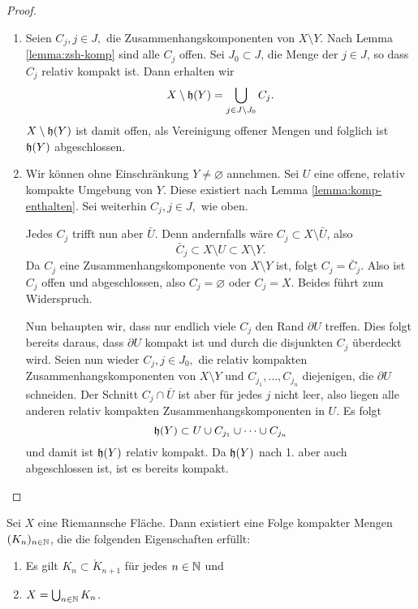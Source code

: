 \begin{proof}
  \begin{enumerate}
  \item Seien $C_j, j \in J,$ die Zusammenhangskomponenten von $X
    \setminus Y$. Nach Lemma \ref{lemma:zsh-komp} sind alle $C_j$ offen.
    Sei $J_0 \subset J$, die Menge der $j \in J$, so dass $C_j$
    relativ kompakt ist. Dann erhalten wir
    \[
    X \setminus \mathfrak{h}(Y) = \bigcup_{j \in J\setminus J_0} C_j.
    \]
    $X \setminus \mathfrak{h}(Y)$ ist damit offen, als Vereinigung offener Mengen und folglich
    ist $\mathfrak{h}(Y)$ abgeschlossen.
  \item Wir können ohne Einschränkung $Y \neq \varnothing$
    annehmen. Sei $U$ eine offene, relativ kompakte Umgebung von
    $Y$. Diese existiert nach Lemma \ref{lemma:komp-enthalten}.
    Sei weiterhin $C_j, j \in J,$ wie oben.

    Jedes $C_j$ trifft nun aber $\bar U$. Denn andernfalls wäre $C_j
    \subset X \setminus \bar U$, also
    \[
    \bar C_j \subset X \setminus U \subset X \setminus Y.
    \]
    Da $C_j$ eine
    Zusammenhangskomponente von $X \setminus Y$ ist, folgt $C_j =
    \bar C_j$. Also ist $C_j$ offen und abgeschlossen, also $C_j =
    \varnothing$ oder $C_j = X$. Beides führt zum Widerspruch.

    Nun behaupten wir, dass nur endlich viele $C_j$ den Rand $\partial
    U$ treffen. 
    Dies folgt bereits daraus, dass $\partial U$ kompakt ist und durch die
    disjunkten $C_j$ überdeckt wird.
    Seien nun wieder $C_j, j \in J_0,$ die relativ kompakten
    Zusammenhangskomponenten von $X \setminus Y$ und $C_{j_1}, \dots,
    C_{j_n}$ diejenigen, die $\partial U$ schneiden. Der Schnitt $C_j
    \cap \bar U$ ist aber für jedes $j$ nicht leer, also liegen alle
    anderen relativ kompakten Zusammenhangskomponenten in
    $U$. Es folgt
    \[
    \mathfrak{h}(Y) \subset U \cup C_{j_1} \cup \dots \cup C_{j_n}
    \]
    und damit ist $\mathfrak{h}(Y)$ relativ kompakt. Da $\mathfrak{h}(Y)$ nach 1. aber auch
    abgeschlossen ist, ist es bereits kompakt.
  \end{enumerate}
\end{proof}


\begin{thm}
  \label{thm:kompakte-ausschöpfung}
  Sei $X$ eine Riemannsche Fläche. Dann existiert eine Folge kompakter Mengen
  $(K_n)_{n \in \mathbb{N}}$, die die folgenden Eigenschaften erfüllt:
  \begin{enumerate}
  \item Es gilt $K_n \subset \mathring K_{n+1}$ für jedes $n \in \mathbb{N}$ und
  \item $X = \bigcup_{n \in \mathbb{N}} K_n$.
  \end{enumerate}
\end{thm}

